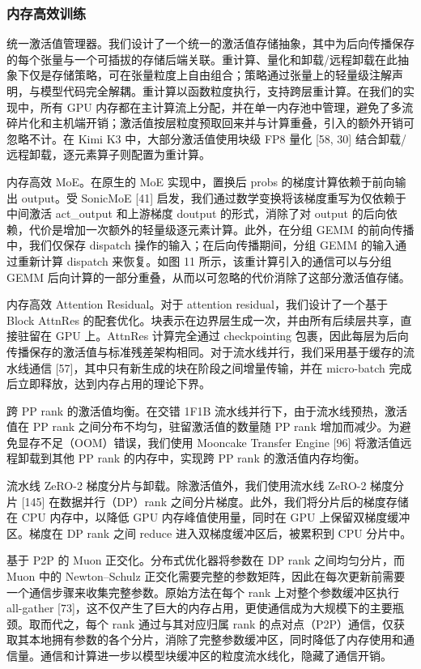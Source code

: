 \subsubsection{内存高效训练}\label{memory-efficient-training}

统一激活值管理器。我们设计了一个统一的激活值存储抽象，其中为后向传播保存的每个张量与一个可插拔的存储后端关联。重计算、量化和卸载/远程卸载在此抽象下仅是存储策略，可在张量粒度上自由组合；策略通过张量上的轻量级注解声明，与模型代码完全解耦。重计算以函数粒度执行，支持跨层重计算。在我们的实现中，所有 GPU 内存都在主计算流上分配，并在单一内存池中管理，避免了多流碎片化和主机端开销；激活值按层粒度预取回来并与计算重叠，引入的额外开销可忽略不计。在 Kimi K3 中，大部分激活值使用块级 FP8 量化 {[}58, 30{]} 结合卸载/远程卸载，逐元素算子则配置为重计算。

内存高效 MoE。在原生的 MoE 实现中，置换后 probs 的梯度计算依赖于前向输出 output。受 SonicMoE {[}41{]} 启发，我们通过数学变换将该梯度重写为仅依赖于中间激活 act\_output 和上游梯度 doutput 的形式，消除了对 output 的后向依赖，代价是增加一次额外的轻量级逐元素计算。此外，在分组 GEMM 的前向传播中，我们仅保存 dispatch 操作的输入；在后向传播期间，分组 GEMM 的输入通过重新计算 dispatch 来恢复。如图 11 所示，该重计算引入的通信可以与分组 GEMM 后向计算的一部分重叠，从而以可忽略的代价消除了这部分激活值存储。

内存高效 Attention Residual。对于 attention residual，我们设计了一个基于 Block AttnRes 的配套优化。块表示在边界层生成一次，并由所有后续层共享，直接驻留在 GPU 上。AttnRes 计算完全通过 checkpointing 包裹，因此每层为后向传播保存的激活值与标准残差架构相同。对于流水线并行，我们采用基于缓存的流水线通信 {[}57{]}，其中只有新生成的块在阶段之间增量传输，并在 micro-batch 完成后立即释放，达到内存占用的理论下界。

跨 PP rank 的激活值均衡。在交错 1F1B 流水线并行下，由于流水线预热，激活值在 PP rank 之间分布不均匀，驻留激活值的数量随 PP rank 增加而减少。为避免显存不足（OOM）错误，我们使用 Mooncake Transfer Engine {[}96{]} 将激活值远程卸载到其他 PP rank 的内存中，实现跨 PP rank 的激活值内存均衡。

流水线 ZeRO-2 梯度分片与卸载。除激活值外，我们使用流水线 ZeRO-2 梯度分片 {[}145{]} 在数据并行（DP）rank 之间分片梯度。此外，我们将分片后的梯度存储在 CPU 内存中，以降低 GPU 内存峰值使用量，同时在 GPU 上保留双梯度缓冲区。梯度在 DP rank 之间 reduce 进入双梯度缓冲区后，被累积到 CPU 分片中。

基于 P2P 的 Muon 正交化。分布式优化器将参数在 DP rank 之间均匀分片，而 Muon 中的 Newton--Schulz 正交化需要完整的参数矩阵，因此在每次更新前需要一个通信步骤来收集完整参数。原始方法在每个 rank 上对整个参数缓冲区执行 all-gather {[}73{]}，这不仅产生了巨大的内存占用，更使通信成为大规模下的主要瓶颈。取而代之，每个 rank 通过与其对应归属 rank 的点对点（P2P）通信，仅获取其本地拥有参数的各个分片，消除了完整参数缓冲区，同时降低了内存使用和通信量。通信和计算进一步以模型块缓冲区的粒度流水线化，隐藏了通信开销。

